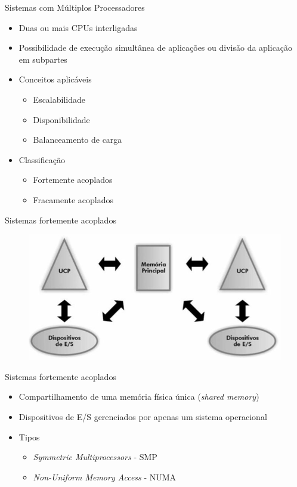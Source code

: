 \documentclass[aspectratio=169,
				xcolor=table]{beamer}
\begin{document}
	\begin{frame}{Sistemas com Múltiplos Processadores}
		\begin{itemize}
			\item Duas ou mais CPUs interligadas
			\vspace{1em}
			\item Possibilidade de execução simultânea de aplicações ou divisão da aplicação em subpartes 
			\vspace{1em}
			\item Conceitos aplicáveis
			\begin{itemize}
				\item Escalabilidade
				\item Disponibilidade
				\item Balanceamento de carga
			\end{itemize}
			\vspace{1em}
			\item Classificação
			\begin{itemize}
				\item Fortemente acoplados
				\item Fracamente acoplados
			\end{itemize}
		\end{itemize}
	\end{frame}

	\begin{frame}{Sistemas fortemente acoplados}	
		\begin{figure}[hbtp]
			\centering
			\includegraphics[width=.85\textwidth, keepaspectratio]{../figs/cap01/fortementeAcoplado.png}
		\end{figure}
	\end{frame}
	
	\begin{frame}{Sistemas fortemente acoplados}
		\begin{itemize}
			\item Compartilhamento de uma memória física única (\textit{shared memory})
			\vspace{1em}
			\item Dispositivos de E/S gerenciados por apenas um sistema operacional
			\vspace{1em}
			\item Tipos
			\begin{itemize}
				\item \textit{Symmetric Multiprocessors} - SMP
				\item \textit{Non-Uniform Memory Access} - NUMA
			\end{itemize}
		\end{itemize}
	\end{frame}
	
\end{document}

